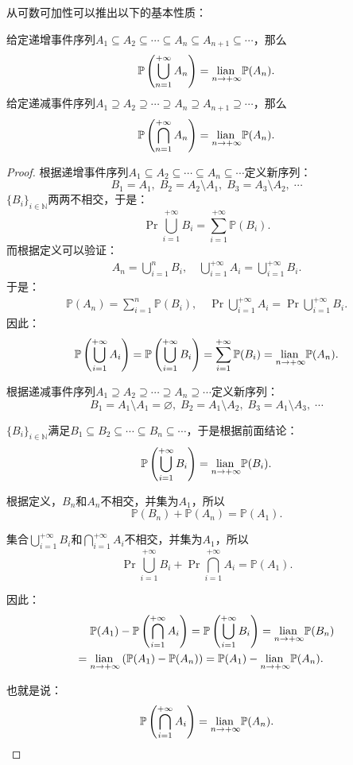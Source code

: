 \documentclass[12pt,UTF8,fontset=none]{ctexbook}
\begin{document}
从可数可加性可以推出以下的基本性质：
\begin{tm}
    给定递增事件序列$A_1\subseteq A_2\subseteq \cdots \subseteq A_n \subseteq A_{n+1} \subseteq \cdots$，那么
    $$ \mathbb{P}\left(\bigcup_{n=1}^{+\infty} A_n\right) = \underset{n\to+\infty}{\operatorname{lian}\,} \mathbb{P}(A_n). $$
    给定递减事件序列$A_1\supseteq A_2\supseteq \cdots \supseteq A_n \supseteq A_{n+1} \supseteq \cdots$，那么
    $$ \mathbb{P}\left(\bigcap_{n=1}^{+\infty} A_n\right) = \underset{n\to+\infty}{\operatorname{lian}\,} \mathbb{P}(A_n). $$
\end{tm}

\begin{proof}
    根据递增事件序列$A_1\subseteq A_2\subseteq \cdots \subseteq A_n \subseteq \cdots$定义新序列：
    $$ B_1 = A_1, \; B_2 = A_2\setminus A_1, \; B_3 = A_3\setminus A_2, \; \cdots$$
    $\{B_i\}_{i\in\mathbb{N}}$两两不相交，于是：
    $$ \Pr{\bigcup_{i=1}^{+\infty} B_i} = \sum_{i=1}^{+\infty} \mathbb{P}(B_i). $$
    而根据定义可以验证：
    \begin{align*}
        A_n = \bigcup_{i=1}^{n} B_i ,\quad \bigcup_{i=1}^{+\infty} A_i = \bigcup_{i=1}^{+\infty} B_i .
    \end{align*}
    于是：
    \begin{align*}
        \mathbb{P}(A_n) = \sum_{i=1}^{n} \mathbb{P}(B_i) , \quad
        \Pr{\bigcup_{i=1}^{+\infty} A_i} = \Pr{\bigcup_{i=1}^{+\infty} B_i} .
    \end{align*}
    因此：
    $$ \mathbb{P}\left(\bigcup_{i=1}^{+\infty} A_i\right) = \mathbb{P}\left(\bigcup_{i=1}^{+\infty} B_i\right) = \sum_{i=1}^{+\infty} \mathbb{P}(B_i) = \underset{n\to+\infty}{\operatorname{lian}\,} \mathbb{P}(A_n). $$

    根据递减事件序列$A_1\supseteq A_2\supseteq \cdots \supseteq A_n \supseteq \cdots$定义新序列：
    $$ B_1 = A_1\setminus A_1 = \varnothing, \; B_2 = A_1\setminus A_2, \; B_3 = A_1\setminus A_3, \; \cdots$$

    $\{B_i\}_{i\in\mathbb{N}}$满足$B_1\subseteq B_2\subseteq \cdots \subseteq B_n \subseteq \cdots$，于是根据前面结论：
    $$ \mathbb{P}\left(\bigcup_{i=1}^{+\infty} B_i\right) = \underset{n\to+\infty}{\operatorname{lian}\,}  \mathbb{P}(B_i). $$

    根据定义，$B_n$和$A_n$不相交，并集为$A_1$，所以
    $$ \mathbb{P}(B_n) + \mathbb{P}(A_n) = \mathbb{P}(A_1). $$

    集合$\bigcup_{i=1}^{+\infty} B_i$和$\bigcap_{i=1}^{+\infty} A_i$不相交，并集为$A_1$，所以
    $$ \Pr{\bigcup_{i=1}^{+\infty} B_i} + \Pr{\bigcap_{i=1}^{+\infty} A_i} = \mathbb{P}(A_1). $$

    因此：
    \begin{align*}
        &\mathbb{P}(A_1) - \mathbb{P}\left(\bigcap_{i=1}^{+\infty} A_i\right) = \mathbb{P}\left(\bigcup_{i=1}^{+\infty} B_i\right) = \underset{n\to+\infty}{\operatorname{lian}\,}  \mathbb{P}(B_n) \\
        =\;& \underset{n\to+\infty}{\operatorname{lian}\,} \left( \mathbb{P}(A_1) - \mathbb{P}(A_n) \right) = \mathbb{P}(A_1) - \underset{n\to+\infty}{\operatorname{lian}\,} \mathbb{P}(A_n).
    \end{align*}
    
    也就是说：
    $$ \mathbb{P}\left(\bigcap_{i=1}^{+\infty} A_i\right) = \underset{n\to+\infty}{\operatorname{lian}\,} \mathbb{P}(A_n). $$
\end{proof}
\end{document}
